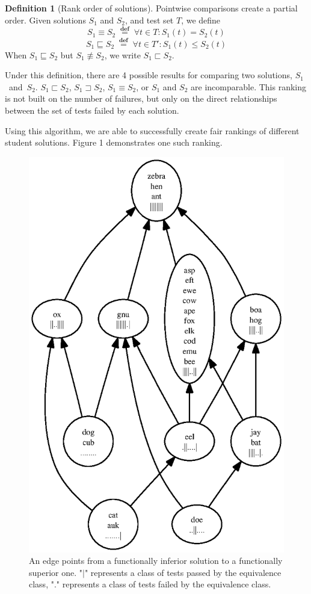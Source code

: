 \documentclass[11pt,twoside]{article}
\newcommand\defined{\mathrel{\;\stackrel{\scriptscriptstyle\mathbf{def}}{=}\;}}
\theoremstyle{definition}
\newtheorem{defn}{Definition}
\begin{document}
\begin{defn}[Rank order of solutions]
Pointwise comparisons create a partial order.
Given solutions $S_1$ and $S_2$, and test set $T$, we define
$$S_1 \equiv S_2 \defined \forall t \in T : S_1(t) = S_2(t)$$
$$S_1 \sqsubseteq S_2 \defined \forall t \in T' : S_1(t) \leq S_2(t)$$
When $S_1 \sqsubseteq S_2$ but $S_1 \not\equiv S_2$, we write
$S_1 \sqsubset S_2$.
\end{defn}
Under this definition, there are 4 possible results for comparing two solutions, $S_1$~and~$S_2$. 
$S_1 \sqsubset S_2$, $S_1 \sqsupset S_2$, $S_1 \equiv S_2$, or $S_1$ and $S_2$  are incomparable. This ranking is not built on the number of failures, but only on the direct relationships between the set of tests failed by each solution.

Using this algorithm, we are able to successfully create fair rankings of different student solutions. Figure 1 demonstrates one such ranking.

\begin{figure}
\centering
\includegraphics{rank1.ps}
\caption{An edge points from a functionally inferior solution to a functionally superior one. "$\vert$" represents a class of tests passed by the equivalence class, "." represents a class of tests failed by the equivalence class.}
\end{figure}
\end{document}
